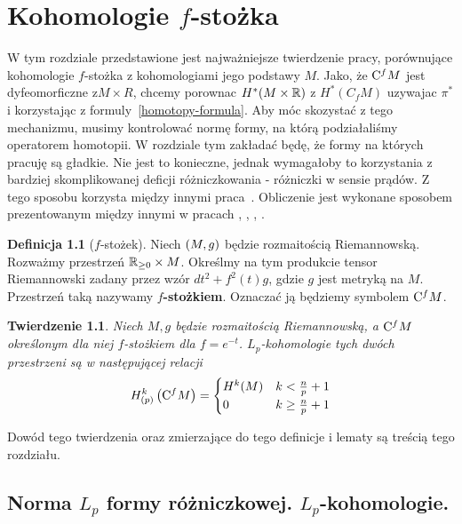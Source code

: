 \documentclass[licencjacka]{pracamgr}
\theoremstyle{definition}
\newtheorem{definition}{Definicja}[section]
\theoremstyle{definition}
\theoremstyle{plain}
\theoremstyle{plain}
\theoremstyle{plain}
\newtheorem{theorem}{Twierdzenie}[section]
\theoremstyle{plain}
\def\cfm{\ensuremath\mathrm{C}^fM}
\def\M{\ensuremath M}
\def\R{\ensuremath\mathbb{R}}
\begin{document}
\chapter{Kohomologie $f$-stożka}
W tym rozdziale przedstawione jest najważniejsze twierdzenie pracy, porównujące
kohomologie $f$-stożka z kohomologiami jego podstawy $M$.
Jako, że $\cfm$ jest dyfeomorficzne z$ M\times R$, chcemy porownac $H^*(M\times \R)$
z $H^*(C_fM)$ uzywajac $\pi^*$ i korzystając z formuly~\ref{homotopy-formula}.
Aby móc skozystać z tego mechanizmu, musimy kontrolować normę formy, na którą
podziałaliśmy operatorem homotopii.
W rozdziale tym zakładać będę, że formy na których pracuję są gładkie. Nie jest
to konieczne, jednak wymagałoby to korzystania z bardziej skomplikowanej deficji
różniczkowania - różniczki w sensie prądów. Z tego sposobu korzysta między innymi
praca~\cite{weber}.
Obliczenie jest wykonane sposobem prezentowanym między innymi w
pracach \cite{cheeger}, \cite{youssin}, \cite{kirwan}, \cite{weber}. \\


\begin{definition}[$f$-stożek]
    Niech $(\M, g)$ będzie rozmaitością Riemannowską. Rozważmy przestrzeń
    $\mathbb{R}_{\geq 0} \times \M$. Określmy na tym produkcie tensor
    Riemannowski zadany przez wzór $dt^2 + f^{2}(t)g $, gdzie $g$ jest
    metryką na $M$.  Przestrzeń taką nazywamy \textbf{$f$-stożkiem}.
    Oznaczać ją będziemy symbolem $\cfm$.
\end{definition}

\begin{theorem}
  Niech $M,g$ będzie rozmaitością Riemannowską, a $\cfm$ określonym dla niej
  $f$-stożkiem dla $f = e^{-t}$. $L_p$-kohomologie tych dwóch przestrzeni są
  w następującej relacji
  \begin{equation}
    H_{(p)}^k \left( \cfm \right) = \begin{cases}
      H^k(M) & k < \frac{n}{p} + 1 \\
      0 & k \geq  \frac{n}{p} + 1 \\
      \end{cases}
  \end{equation}
\end{theorem}

Dowód tego twierdzenia oraz zmierzające do tego definicje i lematy są treścią tego
rozdziału. \\

\section{Norma $L_p$ formy różniczkowej. $L_p$-kohomologie.}
\end{document}
